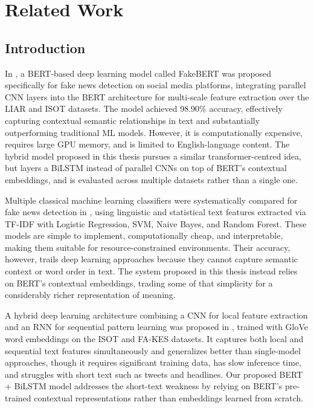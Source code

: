 \sloppy
\chapter{Related Work}
\section{Introduction}

In \citep{Kaliyar2021FakeBERT}, a BERT-based deep learning model called FakeBERT was proposed specifically for fake news detection on social media platforms, integrating parallel CNN layers into the BERT architecture for multi-scale feature extraction over the LIAR and ISOT datasets. The model achieved 98.90\% accuracy, effectively capturing contextual semantic relationships in text and substantially outperforming traditional ML models. However, it is computationally expensive, requires large GPU memory, and is limited to English-language content. The hybrid model proposed in this thesis pursues a similar transformer-centred idea, but layers a BiLSTM instead of parallel CNNs on top of BERT's contextual embeddings, and is evaluated across multiple datasets rather than a single one.

Multiple classical machine learning classifiers were systematically compared for fake news detection in \citep{Aphiwongsophon2021Detecting}, using linguistic and statistical text features extracted via TF-IDF with Logistic Regression, SVM, Naive Bayes, and Random Forest. These models are simple to implement, computationally cheap, and interpretable, making them suitable for resource-constrained environments. Their accuracy, however, trails deep learning approaches because they cannot capture semantic context or word order in text. The system proposed in this thesis instead relies on BERT's contextual embeddings, trading some of that simplicity for a considerably richer representation of meaning.

A hybrid deep learning architecture combining a CNN for local feature extraction and an RNN for sequential pattern learning was proposed in \citep{Nasir2021FakeNews}, trained with GloVe word embeddings on the ISOT and FA-KES datasets. It captures both local and sequential text features simultaneously and generalizes better than single-model approaches, though it requires significant training data, has slow inference time, and struggles with short text such as tweets and headlines. Our proposed BERT + BiLSTM model addresses the short-text weakness by relying on BERT's pre-trained contextual representations rather than embeddings learned from scratch.

